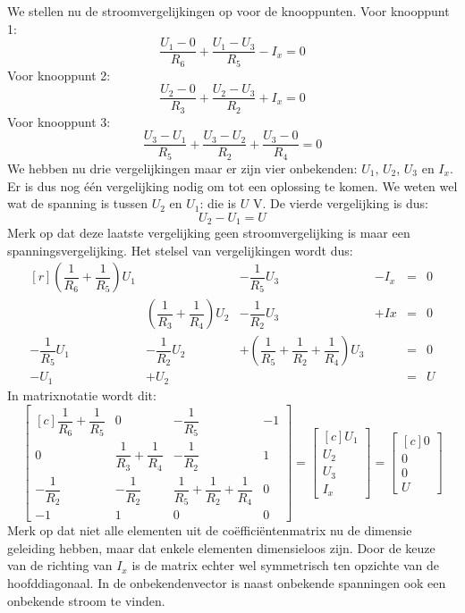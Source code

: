 We stellen nu de stroomvergelijkingen op voor de knooppunten. Voor knooppunt 1:
%
\begin{equation}
\dfrac{U_1-0}{R_6} + \dfrac{U_1-U_3}{R_5} - I_x = 0
\end{equation}
%
Voor knooppunt 2:
%
\begin{equation}
\dfrac{U_2-0}{R_3} + \dfrac{U_2-U_3}{R_2} + I_x = 0
\end{equation}
%
Voor knooppunt 3:
%
\begin{equation}
\dfrac{U_3-U_1}{R_5} + \dfrac{U_3-U_2}{R_2} + \dfrac{U_3-0}{R_4} = 0
\end{equation}
%
We hebben nu drie vergelijkingen maar er zijn vier onbekenden: $U_1$, $U_2$, $U_3$ en $I_x$. Er is dus nog één vergelijking nodig om tot een oplossing te komen. We weten wel wat de spanning is tussen $U_2$ en $U_1$: die is $U$ \si{\volt}. De vierde vergelijking is dus:
%
\begin{equation}
U_2-U_1 = U
\end{equation}
%
Merk op dat deze laatste vergelijking geen stroomvergelijking is maar een spanningsvergelijking. Het stelsel van vergelijkingen wordt dus:
%
\begin{equation}
\begin{matrix*}[r]
\left(\dfrac{1}{R_6}+\dfrac{1}{R_5}\right)U_1 & & -\dfrac{1}{R_5}U_3 & -I_x &=& 0 \\[1em]
 & \left(\dfrac{1}{R_3}+\dfrac{1}{R_4}\right)U_2 & -\dfrac{1}{R_2}U_3 & +Ix &=& 0 \\[1em]
-\dfrac{1}{R_5}U_1 & -\dfrac{1}{R_2}U_2 & +\left(\dfrac{1}{R_5}+\dfrac{1}{R_2}+\dfrac{1}{R_4}\right)U_3 & &=& 0 \\[1.5em]
-U_1 & +U_2 & & &= &U
\end{matrix*}
\end{equation}
%
In matrixnotatie wordt dit:
%
\begin{equation}
\begin{bmatrix*}[c]
\dfrac{1}{R_6}+\dfrac{1}{R_5} & 0 & -\dfrac{1}{R_5} & -1 \\[1em]
0 & \dfrac{1}{R_3}+\dfrac{1}{R_4} & -\dfrac{1}{R_2} & 1  \\[1em]
-\dfrac{1}{R_2} & -\dfrac{1}{R_2} & \dfrac{1}{R_5}+\dfrac{1}{R_2}+\dfrac{1}{R_4} & 0 \\[1.5em]
-1 & 1 & 0 & 0
\end{bmatrix*} =
\begin{bmatrix*}[c]
U_1 \\[1em] U_2\\[1em] U_3\\[1em] I_x
\end{bmatrix*} = 
\begin{bmatrix*}[c]
0 \\[1em] 0 \\[1em] 0 \\[1em] U
\end{bmatrix*}
\end{equation}
%
Merk op dat niet alle elementen uit de coëfficiëntenmatrix nu de dimensie geleiding hebben, maar dat enkele elementen dimensieloos zijn. Door de keuze van de richting van $I_x$ is de matrix echter wel symmetrisch ten opzichte van de hoofddiagonaal. In de onbekendenvector is naast onbekende spanningen ook een onbekende stroom te vinden.

